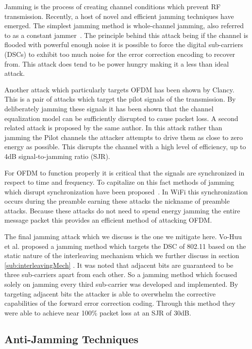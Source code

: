 \documentclass[sigconf, anonymous]{acmart}
\begin{document}
Jamming is the process of creating channel conditions which prevent RF transmission. Recently, a host of novel and efficient jamming techniques have emerged.  The simplest jamming method is whole-channel jamming, also referred to as a constant jammer~\cite{grover2014jamming}. The principle behind this attack being if the channel is flooded with powerful enough noise it is possible to force the digital sub-carriers (DSCs) to exhibit too much noise for the error correction encoding to recover from. This attack does tend to be power hungry making it a less than ideal attack. 

Another attack which particularly targets OFDM has been shown by Clancy\cite{clancy2011efficient}. This is a pair of attacks which target the pilot signals of the transmission. By deliberately jamming these signals it has been shown that the channel equalization model can be sufficiently disrupted to cause packet loss. A second related attack is proposed by the same author. In this attack rather than jamming the Pilot channels the attacker attempts to drive them as close to zero energy as possible. This disrupts the channel with a high level of efficiency, up to 4dB signal-to-jamming ratio (SJR).

For OFDM to function properly it is critical that the signals are synchronized in respect to time and frequency. To capitalize on this fact methods of jamming which disrupt synchronization have been proposed~\cite{mueller2013efficient, la2013phase}. In WiFi this synchronization occurs during the preamble earning these attacks the nickname of preamble attacks. Because these attacks do not need to spend energy jamming the entire message packet this provides an efficient method of attacking OFDM.

The final jamming attack which we discuss is the one we mitigate here. Vo-Huu et al. proposed a jamming method which targets the DSC of 802.11 based on the static nature of the interleaving mechanism which we further discuss in section \ref{sub:interleavingMech} \cite{vo2016interleaving}. It was noted that adjacent bits are guaranteed to be three sub-carriers apart from each other. So a jamming method which focused solely on jamming every third sub-carrier was developed and implemented. By targeting adjacent bits the attacker is able to overwhelm the corrective capabilities of the forward error correction coding. Through this method they were able to achieve near 100\% packet loss at an SJR of 30dB. 

\subsection{Anti-Jamming Techniques}
\label{sec:anti_jamming}
\end{document}
